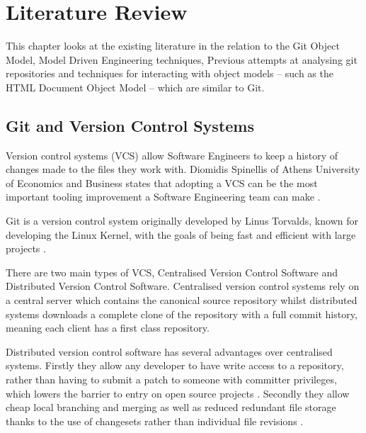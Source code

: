 \documentclass[11pt]{book}
\begin{document}
\chapter{Literature Review}
		
\label{litreview}
This chapter looks at the existing literature in the relation to the Git Object Model, Model Driven Engineering techniques, Previous attempts at analysing git repositories and techniques for interacting with object models -- such as the HTML Document Object Model -- which are similar to Git.

\section{Git and Version Control Systems}
\label{sec:git}
Version control systems (VCS) allow Software Engineers to keep a history of changes made to the files they work with. Diomidis Spinellis of Athens University of Economics and Business states that adopting a VCS can be the most important tooling improvement a Software Engineering team can make \cite{toolsofthetrade}.

Git is a version control system originally developed by Linus Torvalds, known for developing the Linux Kernel, with the goals of being fast and efficient with large projects \cite{progit}.

There are two main types of VCS, Centralised Version Control Software and Distributed Version Control Software. Centralised version control systems rely on a central server which contains the canonical source repository whilst distributed systems downloads a complete clone of the repository with a full commit history, meaning each client has a first class repository\cite{whydistributed}.

Distributed version control software has several advantages over centralised systems. Firstly they allow any developer to have write access to a repository, rather than having to submit a patch to someone with committer privileges, which lowers the barrier to entry on open source projects \cite{distributedimpactoss}. Secondly they allow cheap local branching and merging as well as reduced redundant file storage thanks to the use of changesets rather than individual file revisions \cite{distributedimpactoss}. 
\end{document}
